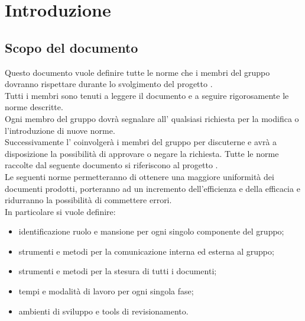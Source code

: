 %


\section{Introduzione}

\subsection{Scopo del documento}
Questo documento vuole definire tutte le norme che i membri del gruppo \groupName{} dovranno rispettare durante lo svolgimento del progetto \projectName.\\
Tutti i membri sono tenuti a leggere il documento e a seguire rigorosamente le norme descritte.\\
Ogni membro del gruppo dovrà segnalare all'\roleAdministrator{} qualsiasi richiesta per la modifica o l'introduzione di nuove norme.\\
Successivamente l'\roleAdministrator{} coinvolgerà i membri del gruppo per discuterne e avrà a disposizione la possibilità di approvare o negare la richiesta.
Tutte le norme raccolte dal seguente documento si riferiscono al progetto \projectName.\\
Le seguenti norme permetteranno di ottenere una maggiore uniformità dei documenti prodotti, porteranno ad un incremento dell'efficienza e della efficacia e ridurranno la possibilità di commettere errori.\\
In particolare si vuole definire:
\begin{itemize}
\item identificazione ruolo e mansione per ogni singolo componente del gruppo;
\item strumenti e metodi per la comunicazione interna ed esterna al gruppo;
\item strumenti e metodi per la stesura di tutti i documenti;
\item tempi e modalità di lavoro per ogni singola fase;
\item ambienti di sviluppo e tools di revisionamento.
\end{itemize}

